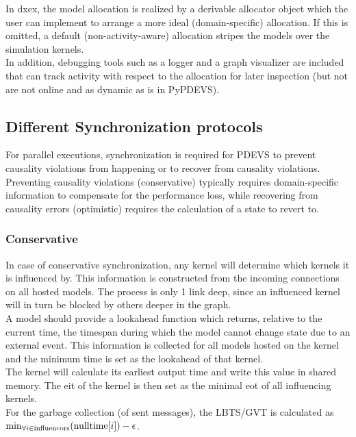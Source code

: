 In dxex, the model allocation is realized by a derivable allocator object which the user can implement to arrange a more ideal (domain-specific) allocation. If this is omitted, a default (non-activity-aware) allocation stripes the models over the simulation kernels.\\
In addition, debugging tools such as a logger and a graph visualizer are included that can track activity with respect to the allocation for later inspection (but not are not online and as dynamic as is in PyPDEVS).\\
\subsection{Different Synchronization protocols}
For parallel executions, synchronization is required for PDEVS to prevent causality violations from happening or to recover from causality violations. Preventing causality violations (conservative) typically requires domain-specific information to compensate for the performance loss, while recovering from causality errors (optimistic) requires the calculation of a state to revert to.

\subsubsection{Conservative}
In case of conservative synchronization, any kernel will determine which kernels it is influenced by. This information is constructed from the incoming connections on all hosted models. The process is only 1 link deep, since an influenced kernel will in turn be blocked by others deeper in the graph.\\
A model should provide a lookahead function which returns, relative to the current time, the timespan during which the model cannot change state due to an external event. This information is collected for all models hosted on the kernel and the minimum time is set as the lookahead of that kernel. \\
The kernel will calculate its earliest output time and write this value in shared memory. The eit of the kernel is then set as the minimal eot of all influencing kernels. \\
For the garbage collection (of sent messages), the LBTS/GVT is calculated as $\min_{\forall i \in \textup{influencors}}( \textup{nulltime}[i])  - \epsilon $.\\

